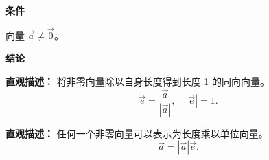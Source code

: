 \begin{statementbox}
	\textbf{\textcolor{CStatement}{条件}}
	\begin{description}[style=nextline, leftmargin=2.8em, labelsep=0.5em, itemsep=0.35em]
		\item[\textbf{\textcolor{CStatement}{条件 1（非零向量前提）：}}] 向量 $\vec{a} \neq \vec{0}$。
	\end{description}

	\textbf{\textcolor{CStatement}{结论}}
	\begin{description}[style=nextline, leftmargin=2.8em, labelsep=0.5em, itemsep=0.45em]
		\item[\textbf{\textcolor{CStatement}{结论一（单位向量定义）：}}]
			\textbf{\textcolor{CStatement}{直观描述：}}
			将非零向量除以自身长度得到长度 1 的同向向量。
			\[
				\vec{e} = \frac{\vec{a}}{|\vec{a}|}, \quad |\vec{e}| = 1.
			\]

		\item[\textbf{\textcolor{CStatement}{推广结论（向量分解）：}}]
			\textbf{\textcolor{CStatement}{直观描述：}}
			任何一个非零向量可以表示为长度乘以单位向量。
			\[
				\vec{a} = |\vec{a}| \vec{e}.
			\]
	\end{description}
\end{statementbox}
